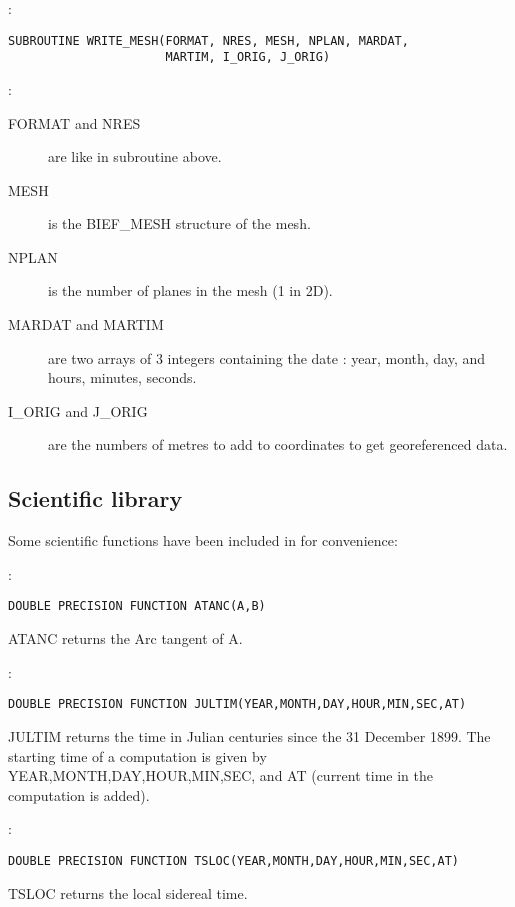 :
\begin{lstlisting}[language=TelFortran]
SUBROUTINE WRITE_MESH(FORMAT, NRES, MESH, NPLAN, MARDAT,
                      MARTIM, I_ORIG, J_ORIG)
\end{lstlisting}

:
\begin{description}
  \item [FORMAT and NRES] are like in subroutine 
    above.
  \item [MESH] is the BIEF\_MESH structure of the mesh.
  \item [NPLAN] is the number of planes in the mesh (1 in 2D).
  \item [MARDAT and MARTIM] are two arrays of 3 integers containing the date :
    year, month, day, and hours, minutes, seconds.
  \item [I\_ORIG and J\_ORIG] are the numbers of metres to add to coordinates
    to get georeferenced data.
\end{description}

\subsection{Scientific library}

Some scientific functions have been included in \bief for convenience:

:
\begin{lstlisting}[language=TelFortran]
DOUBLE PRECISION FUNCTION ATANC(A,B)
\end{lstlisting}

ATANC returns the Arc tangent of A.

:
\begin{lstlisting}[language=TelFortran]
DOUBLE PRECISION FUNCTION JULTIM(YEAR,MONTH,DAY,HOUR,MIN,SEC,AT)
\end{lstlisting}

JULTIM returns the time in Julian centuries since the 31 December 1899. The
starting time of a computation is given by YEAR,MONTH,DAY,HOUR,MIN,SEC, and AT
(current time in the computation is added).

:
\begin{lstlisting}[language=TelFortran]
DOUBLE PRECISION FUNCTION TSLOC(YEAR,MONTH,DAY,HOUR,MIN,SEC,AT)
\end{lstlisting}

TSLOC returns the local sidereal time.

